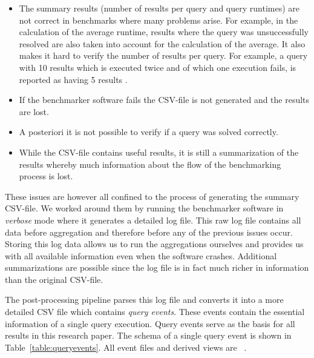\begin{itemize}
	\item The summary results (number of results per query and query runtimes) are not correct in benchmarks where many problems arise. 
	For example, in the calculation of the average runtime, results where the query was unsuccessfully resolved are also taken into account for the calculation of the average. 
	It also makes it hard to verify the number of results per query. For example, a query with 10 results which is executed twice and of which one execution fails, is reported as having 5 results .
	\item If the benchmarker software fails the CSV-file is not generated and the results are lost.
	\item A posteriori it is not possible to verify if a query was solved correctly.
	\item While the CSV-file contains useful results, it is still a summarization of the results whereby much information about the flow of the benchmarking process is lost. 
\end{itemize}

\vspace{5mm} \noindent These issues are however all confined to the process of generating the summary CSV-file. We worked around them by running 
the benchmarker software in \emph{verbose} mode where it generates a detailed log file. This raw log file contains all data before aggregation and therefore
before any of the previous issues occur. Storing this log data allows us to run the aggregations ourselves and provides us with all available information even when the software crashes. Additional summarizations are possible since the log file is in fact much richer in information than the original CSV-file.

The post-processing pipeline parses this log file and converts it into a more detailed CSV file which contains \emph{query events}. These events contain the essential information of a single query execution. Query events serve as the basis for all results in this research paper. The schema of a single query event is shown in Table~\ref{table:queryevents}. All event files and derived views are ~\cite{bmresults}.

